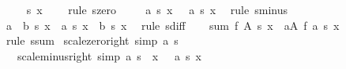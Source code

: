 \begin{isabellebody}
\ \ \isamarkupfalse%
\ {\isachardoublequoteopen}{}\ {\isacharasterisk}{\kern0pt}s\ x\ {\isacharequal}{\kern0pt}\ {}{\isachardoublequoteclose}\ \isamarkupfalse%
\ {\isacharparenleft}{\kern0pt}rule\ s{\isachardot}{\kern0pt}zero{\isacharparenright}{\kern0pt}\isanewline
\ \ \isamarkupfalse%
\ {\isachardoublequoteopen}{\isacharparenleft}{\kern0pt}{\isacharminus}{\kern0pt}\ a{\isacharparenright}{\kern0pt}\ {\isacharasterisk}{\kern0pt}s\ x\ {\isacharequal}{\kern0pt}\ {\isacharminus}{\kern0pt}\ {\isacharparenleft}{\kern0pt}a\ {\isacharasterisk}{\kern0pt}s\ x{\isacharparenright}{\kern0pt}{\isachardoublequoteclose}\ \isamarkupfalse%
\ {\isacharparenleft}{\kern0pt}rule\ s{\isachardot}{\kern0pt}minus{\isacharparenright}{\kern0pt}\isanewline
\ \ \isamarkupfalse%
\ {\isachardoublequoteopen}{\isacharparenleft}{\kern0pt}a\ {\isacharminus}{\kern0pt}\ b{\isacharparenright}{\kern0pt}\ {\isacharasterisk}{\kern0pt}s\ x\ {\isacharequal}{\kern0pt}\ a\ {\isacharasterisk}{\kern0pt}s\ x\ {\isacharminus}{\kern0pt}\ b\ {\isacharasterisk}{\kern0pt}s\ x{\isachardoublequoteclose}\ \isamarkupfalse%
\ {\isacharparenleft}{\kern0pt}rule\ s{\isachardot}{\kern0pt}diff{\isacharparenright}{\kern0pt}\isanewline
\ \ \isamarkupfalse%
\ {\isachardoublequoteopen}{\isacharparenleft}{\kern0pt}sum\ f\ A{\isacharparenright}{\kern0pt}\ {\isacharasterisk}{\kern0pt}s\ x\ {\isacharequal}{\kern0pt}\ {\isacharparenleft}{\kern0pt}{\isasymSum}a{\isasymin}A{\isachardot}{\kern0pt}\ {\isacharparenleft}{\kern0pt}f\ a{\isacharparenright}{\kern0pt}\ {\isacharasterisk}{\kern0pt}s\ x{\isacharparenright}{\kern0pt}{\isachardoublequoteclose}\ \isamarkupfalse%
\ {\isacharparenleft}{\kern0pt}rule\ s{\isachardot}{\kern0pt}sum{\isacharparenright}{\kern0pt}\isanewline
{}\isamarkupfalse%
%
\endisatagproof
{\isafoldproof}%
%
\isadelimproof
\isanewline
%
\endisadelimproof
\isanewline
{}\isamarkupfalse%
\ scale{\isacharunderscore}{\kern0pt}zero{\isacharunderscore}{\kern0pt}right\ {\isacharbrackleft}{\kern0pt}simp{\isacharbrackright}{\kern0pt}{\isacharcolon}{\kern0pt}\ {\isachardoublequoteopen}a\ {\isacharasterisk}{\kern0pt}s\ {}\ {\isacharequal}{\kern0pt}\ {}{\isachardoublequoteclose}\isanewline
\ \ \ scale{\isacharunderscore}{\kern0pt}minus{\isacharunderscore}{\kern0pt}right\ {\isacharbrackleft}{\kern0pt}simp{\isacharbrackright}{\kern0pt}{\isacharcolon}{\kern0pt}\ {\isachardoublequoteopen}a\ {\isacharasterisk}{\kern0pt}s\ {\isacharparenleft}{\kern0pt}{\isacharminus}{\kern0pt}\ x{\isacharparenright}{\kern0pt}\ {\isacharequal}{\kern0pt}\ {\isacharminus}{\kern0pt}\ {\isacharparenleft}{\kern0pt}a\ {\isacharasterisk}{\kern0pt}s\ x{\isacharparenright}{\kern0pt}{\isachardoublequoteclose}\isanewline

\end{isabellebody}
